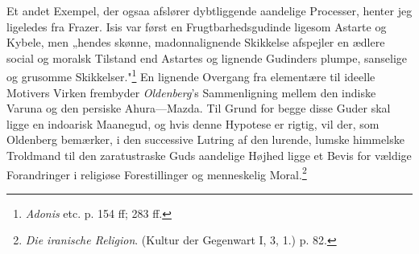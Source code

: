 \documentclass[12pt,a4paper]{book}
\begin{document}
Et andet Exempel, der ogsaa afslører dybtliggende aandelige Processer, henter jeg ligeledes
fra Frazer. Isis var først en Frugtbarhedsgudinde ligesom Astarte og Kybele, men „hendes
skønne, madonnalignende Skikkelse afspejler en ædlere social og moralsk Tilstand end Astartes
og lignende Gudinders plumpe, sanselige og grusomme Skikkelser."\footnote{\emph{Adonis} etc.
p. 154 ff; 283 ff.} En lignende Overgang fra elementære til ideelle Motivers Virken frembyder
\emph{Oldenberg}'s Sammenligning mellem den indiske Varuna og den persiske Ahura—Mazda. Til
Grund for begge disse Guder skal ligge en indoarisk Maanegud, og hvis denne Hypotese er
rigtig, vil der, som Oldenberg bemærker, i den successive Lutring af den lurende, lumske
himmelske Troldmand til den zaratustraske Guds aandelige Højhed ligge et Bevis for vældige
Forandringer i religiøse Forestillinger og menneskelig Moral.\footnote{\emph{Die iranische
Religion}. (Kultur der Gegenwart I, 3, 1.) p. 82.}
\end{document}
